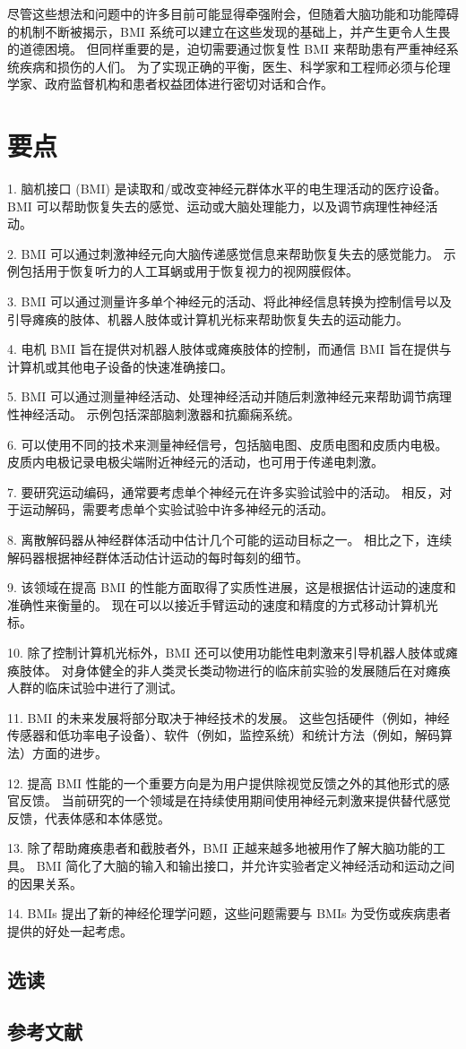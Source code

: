 尽管这些想法和问题中的许多目前可能显得牵强附会，但随着大脑功能和功能障碍的机制不断被揭示，BMI 系统可以建立在这些发现的基础上，并产生更令人生畏的道德困境。 
但同样重要的是，迫切需要通过恢复性 BMI 来帮助患有严重神经系统疾病和损伤的人们。 
为了实现正确的平衡，医生、科学家和工程师必须与伦理学家、政府监督机构和患者权益团体进行密切对话和合作。


\section{要点}

1. 脑机接口 (BMI) 是读取和/或改变神经元群体水平的电生理活动的医疗设备。 BMI 可以帮助恢复失去的感觉、运动或大脑处理能力，以及调节病理性神经活动。 

2. BMI 可以通过刺激神经元向大脑传递感觉信息来帮助恢复失去的感觉能力。 示例包括用于恢复听力的人工耳蜗或用于恢复视力的视网膜假体。 

3. BMI 可以通过测量许多单个神经元的活动、将此神经信息转换为控制信号以及引导瘫痪的肢体、机器人肢体或计算机光标来帮助恢复失去的运动能力。 

4. 电机 BMI 旨在提供对机器人肢体或瘫痪肢体的控制，而通信 BMI 旨在提供与计算机或其他电子设备的快速准确接口。

5. BMI 可以通过测量神经活动、处理神经活动并随后刺激神经元来帮助调节病理性神经活动。 示例包括深部脑刺激器和抗癫痫系统。 

6. 可以使用不同的技术来测量神经信号，包括脑电图、皮质电图和皮质内电极。 皮质内电极记录电极尖端附近神经元的活动，也可用于传递电刺激。 

7. 要研究运动编码，通常要考虑单个神经元在许多实验试验中的活动。 相反，对于运动解码，需要考虑单个实验试验中许多神经元的活动。 

8. 离散解码器从神经群体活动中估计几个可能的运动目标之一。 相比之下，连续解码器根据神经群体活动估计运动的每时每刻的细节。 

9. 该领域在提高 BMI 的性能方面取得了实质性进展，这是根据估计运动的速度和准确性来衡量的。 现在可以以接近手臂运动的速度和精度的方式移动计算机光标。 

10. 除了控制计算机光标外，BMI 还可以使用功能性电刺激来引导机器人肢体或瘫痪肢体。 对身体健全的非人类灵长类动物进行的临床前实验的发展随后在对瘫痪人群的临床试验中进行了测试。 

11. BMI 的未来发展将部分取决于神经技术的发展。 这些包括硬件（例如，神经传感器和低功率电子设备）、软件（例如，监控系统）和统计方法（例如，解码算法）方面的进步。 

12. 提高 BMI 性能的一个重要方向是为用户提供除视觉反馈之外的其他形式的感官反馈。 当前研究的一个领域是在持续使用期间使用神经元刺激来提供替代感觉反馈，代表体感和本体感觉。 

13. 除了帮助瘫痪患者和截肢者外，BMI 正越来越多地被用作了解大脑功能的工具。 BMI 简化了大脑的输入和输出接口，并允许实验者定义神经活动和运动之间的因果关系。 

14. BMIs 提出了新的神经伦理学问题，这些问题需要与 BMIs 为受伤或疾病患者提供的好处一起考虑。

\subsection{选读}
\subsection{参考文献}

